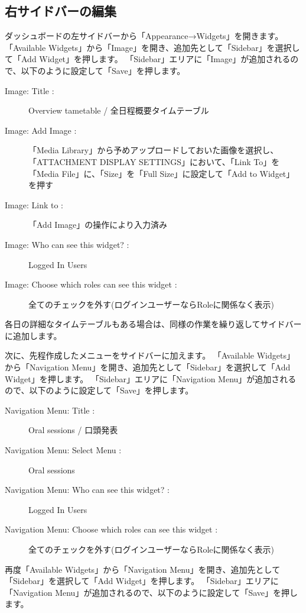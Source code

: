 \documentclass[titlepage,10pt,a4paper,uplatex]{jsbook}
\begin{document}
\subsection{右サイドバーの編集}

ダッシュボードの左サイドバーから「Appearance→Widgets」を開きます。
「Available Widgets」から「Image」を開き、追加先として「Sidebar」を選択して「Add Widget」を押します。
「Sidebar」エリアに「Image」が追加されるので、以下のように設定して「Save」を押します。

\begin{description}
\item[Image: Title : ] Overview tametable / 全日程概要タイムテーブル
\item[Image: Add Image : ] 「Media Library」から予めアップロードしておいた画像を選択し、「ATTACHMENT DISPLAY SETTINGS」において、「Link To」を「Media File」に、「Size」を「Full Size」に設定して「Add to Widget」を押す
\item[Image: Link to : ] 「Add Image」の操作により入力済み
\item[Image: Who can see this widget? : ] Logged In Users
\item[Image: Choose which roles can see this widget : ] 全てのチェックを外す(ログインユーザーならRoleに関係なく表示)
\end{description}

各日の詳細なタイムテーブルもある場合は、同様の作業を繰り返してサイドバーに追加します。

次に、先程作成したメニューをサイドバーに加えます。
「Available Widgets」から「Navigation Menu」を開き、追加先として「Sidebar」を選択して「Add Widget」を押します。
「Sidebar」エリアに「Navigation Menu」が追加されるので、以下のように設定して「Save」を押します。

\begin{description}
\item[Navigation Menu: Title : ] Oral sessions / 口頭発表
\item[Navigation Menu: Select Menu : ] Oral sessions
\item[Navigation Menu: Who can see this widget? : ] Logged In Users
\item[Navigation Menu: Choose which roles can see this widget : ] 全てのチェックを外す(ログインユーザーならRoleに関係なく表示)
\end{description}

再度「Available Widgets」から「Navigation Menu」を開き、追加先として「Sidebar」を選択して「Add Widget」を押します。
「Sidebar」エリアに「Navigation Menu」が追加されるので、以下のように設定して「Save」を押します。
\end{document}
